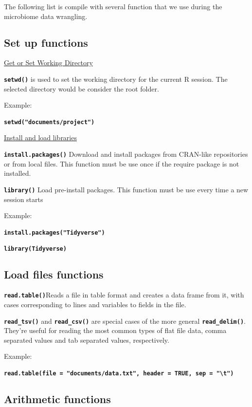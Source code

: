\documentclass[
  letterpaper,
  DIV=11,
  numbers=noendperiod]{scrartcl}
\begin{document}
The following list is compile with several function that we use during
the microbiome data wrangling.

\hypertarget{set-up-functions}{%
\subsection{Set up functions}\label{set-up-functions}}

\uline{Get or Set Working Directory}

\textbf{\texttt{setwd()}} is used to set the working directory for the
current R session. The selected directory would be consider the root
folder.

Example:

\textbf{\texttt{setwd("documents/project")}}

\uline{Install and load libraries}

\textbf{\texttt{install.packages()}} Download and install packages from
CRAN-like repositories or from local files. This function must be use
once if the require package is not installed.

\textbf{\texttt{library()}} Load pre-install packages. This function
must be use every time a new session starts

Example:

\textbf{\texttt{install.packages("Tidyverse")}}

\textbf{\texttt{library(Tidyverse)}}

\hypertarget{load-files-functions}{%
\subsection{Load files functions}\label{load-files-functions}}

\textbf{\texttt{read.table()}}Reads a file in table format and creates a
data frame from it, with cases corresponding to lines and variables to
fields in the file.

\textbf{\texttt{read\_tsv()}} and \textbf{\texttt{read\_csv()}} are
special cases of the more general \textbf{\texttt{read\_delim()}}.
They're useful for reading the most common types of flat file data,
comma separated values and tab separated values, respectively.

Example:

\textbf{\texttt{read.table(file\ =\ "documents/data.txt",\ header\ =\ TRUE,\ sep\ =\ "\textbackslash{}t")}}

\hypertarget{arithmetic-functions}{%
\subsection{Arithmetic functions}\label{arithmetic-functions}}
\end{document}
